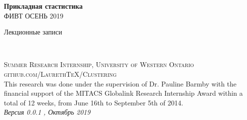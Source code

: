\documentclass[11pt,fleqn]{book} %
\begin{document}

\begingroup
\thispagestyle{empty}
\centering
\vspace*{5cm}
\par\normalfont\fontsize{35}{35}\sffamily\selectfont
\textbf{Прикладная стастистика}\\
{\LARGE  ФИВТ ОСЕНЬ 2019}\par %
\vspace*{1cm}
{\Huge Лекционные записи}\par %
\endgroup


\newpage
~\vfill
\thispagestyle{empty}


\noindent \textsc{Summer Research Internship, University of Western Ontario}\\

\noindent \textsc{github.com/LaurethTeX/Clustering}\\ %

\noindent This research was done under the supervision of Dr. Pauline Barmby with the financial support of the MITACS Globalink Research Internship Award within a total of 12 weeks, from June 16th to September 5th of 2014.\\ %

\noindent \textit{Версия 0.0.1 , Октябрь 2019} %



\pagestyle{empty} %

\tableofcontents %
\end{document}
